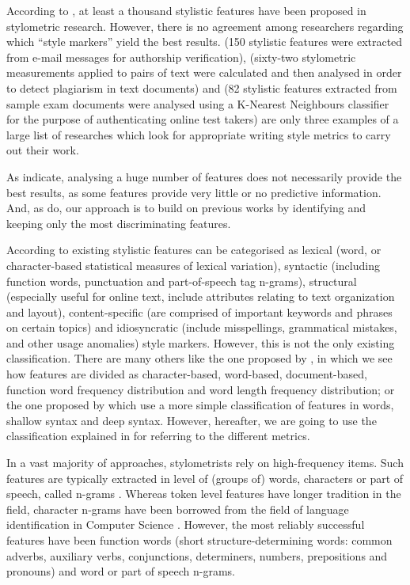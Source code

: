 According to \cite{rudman1997state}, at least a thousand stylistic features have been proposed in stylometric research. However, there is no agreement among researchers regarding which ``style markers'' yield the best results. \cite{chen2011authorship} (150 stylistic features were extracted from e-mail messages for authorship verification), \cite{gruner2005tool} (sixty-two stylometric measurements applied to pairs of text were calculated and then analysed in order to detect plagiarism in text documents) and \cite{canales2011stylometry} (82 stylistic features extracted from sample exam documents were analysed using a K-Nearest Neighbours classifier for the purpose of authenticating online test takers) are only three examples of a large list of researches which look for appropriate writing style metrics to carry out their work.

As \cite{brocardo2013authorship} indicate, analysing a huge number of features does not necessarily provide the best results, as some features provide very little or no predictive information. And, as \cite{brocardo2013authorship} do, our approach is to build on previous works by identifying and keeping only the most discriminating features.

According to \cite{abbasi2008writeprints} existing stylistic features can be categorised as lexical (word, or character-based statistical measures of lexical variation), syntactic (including function words, punctuation and part-of-speech tag n-grams), structural (especially useful for online text, include attributes relating to text organization and layout), content-specific (are comprised of important keywords and phrases on certain topics) and idiosyncratic (include misspellings, grammatical mistakes, and other usage anomalies) style markers. However, this is not the only existing classification. There are many others like the one proposed by \cite{corney2001identifying}, in which we see how features are divided as character-based, word-based, document-based, function word frequency distribution and word length frequency distribution; or the one proposed by \cite{cfgstylo} which use a more simple classification of features in words, shallow syntax and deep syntax. However, hereafter, we are going to use the classification explained in \cite{abbasi2008writeprints} for referring to the different metrics.

In a vast majority of approaches, stylometrists rely on high-frequency items. Such features are typically extracted in level of (groups of) words, characters or part of speech, called n-grams \citep{kjell1994discrimination}. Whereas token level features have longer tradition in the field, character n-grams have been borrowed from the field of language identification in Computer Science \citep{stamatatos2009survey, eder2011style}. However, the most reliably successful features have been function words (short structure-determining words: common adverbs, auxiliary verbs, conjunctions, determiners, numbers, prepositions and pronouns) and word or part of speech n-grams. 

